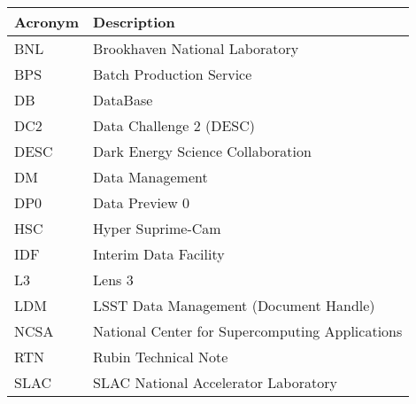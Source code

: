 \addtocounter{table}{-1}
\begin{longtable}{p{}p{}}\hline
\textbf{Acronym} & \textbf{Description}  \\\hline

BNL & Brookhaven National Laboratory \\\hline
BPS & Batch Production Service \\\hline
DB & DataBase \\\hline
DC2 & Data Challenge 2 (DESC) \\\hline
DESC & Dark Energy Science Collaboration \\\hline
DM & Data Management \\\hline
DP0 & Data Preview 0 \\\hline
HSC & Hyper Suprime-Cam \\\hline
IDF & Interim Data Facility \\\hline
L3 & Lens 3 \\\hline
LDM & LSST Data Management (Document Handle) \\\hline
NCSA & National Center for Supercomputing Applications \\\hline
RTN & Rubin Technical Note \\\hline
SLAC & SLAC National Accelerator Laboratory \\\hline
\end{longtable}
